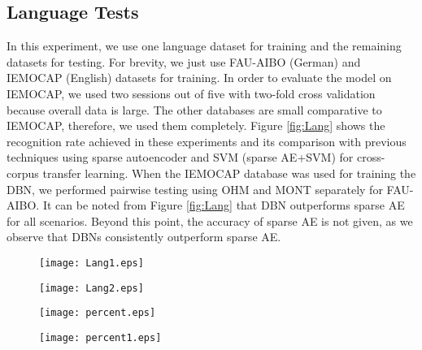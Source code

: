 \documentclass[a4paper]{article}
\newcommand*{\RR}[1]{\textcolor{purple}{#1}}
\begin{document}
\subsection{Language Tests}
In this experiment, we use one language dataset for training and the remaining datasets for testing. For brevity, we just use FAU-AIBO (German) and IEMOCAP (English) datasets for training. %
In order to evaluate the model on IEMOCAP, we used two sessions out of five with two-fold cross validation because overall data is large. The other databases are small comparative to IEMOCAP, therefore, we used them completely. Figure \ref{fig:Lang} shows the recognition rate achieved in these experiments and its comparison with previous techniques using sparse autoencoder and SVM (sparse AE+SVM) for cross-corpus transfer learning. When the IEMOCAP database was used for training the DBN, we performed pairwise testing using OHM and MONT separately for FAU-AIBO. It can be noted from Figure \ref{fig:Lang} that DBN outperforms sparse AE for all scenarios. Beyond this point, the accuracy of sparse AE is not given, as we observe that DBNs consistently outperform sparse AE.


\begin{figure*}[!ht]%
\centering
\begin{subfigure}{0.4\linewidth}
\texttt{[image: Lang1.eps]}%
\captionsetup{justification=centering}
\caption{}%
\label{Lang1}%
\end{subfigure}%
\begin{subfigure}{0.4\linewidth}
\texttt{[image: Lang2.eps]}%
\captionsetup{justification=centering}
\caption{} %
\label{lang2}%
\end{subfigure}%
\caption{Comparison of language tests using DBN and sparse AE. Figure \ref{Lang1} represents the recognition rate using IEMOCAP (English) for training and other databases for testing whereas \ref{lang2} shows the recognition rate using FAU-AIBO (German) for training and other databases for testing.}
\label{fig:Lang}
\end{figure*}

\begin{figure*}[!ht]%
\centering
\begin{subfigure}{0.4\linewidth}
\texttt{[image: percent.eps]}%
\captionsetup{justification=centering}
\caption{}%
\label{Per1}%
\end{subfigure}%
\begin{subfigure}{0.4\linewidth}
\texttt{[image: percent1.eps]}%
\captionsetup{justification=centering}
\caption{} %
\label{Per2}%
\end{subfigure}%
\caption{Impact of using a percentage of target date with training data. Where \ref{Per1} shows the training with IEMOCAP and \ref{Per2} is when training is performed using FAU-AIBO.}
\label{Perentage}
\end{figure*}
\end{document}
